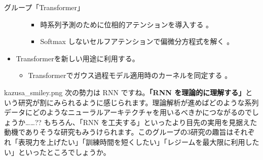 \documentclass[b5paper,xelatex,ja=standard,10pt]{bxjsarticle}
\begin{document}
\begin{PROP}[left=0pt]{グループ「Transformer」}
\begin{itemize}
\begin{itemize}
\begin{itemize}
      \item 時系列予測のために位相的アテンションを導入する \cite{SebastianZeng2021}。
      \item Softmax しないセルフアテンションで偏微分方程式を解く \cite{ShuhaoCao2021}。
    \end{itemize}
  \end{itemize}
  \vspace{6pt}
  \item Transformerを新しい用途に利用する。
  \begin{itemize}
    \item Transformerでガウス過程モデル適用時のカーネルを同定する \cite{FergusSimpson2021}。
  \end{itemize}
\end{itemize}
\end{PROP}
\vspace{1pt}

\begin{SERIFU}[colback=PaleIris, colbacktitle=PaleIris2]{kazusa_smiley.png}
次の勢力は RNN ですね。\textbf{「RNN を理論的に理解する」}という研究が割にみられるように感じられます。理論解析が進めばどのような系列データにどのようなニューラルアーキテクチャを用いるべきかにつながるのでしょうか……?? もちろん、「RNN を工夫する」といったより目先の実用を見据えた動機でありそうな研究もみうけられます。このグループの3研究の趣旨はそれぞれ「表現力を上げたい」「訓練時間を短くしたい」「レジームを最大限に利用したい」といったところでしょうか。
\end{SERIFU}
\end{document}
